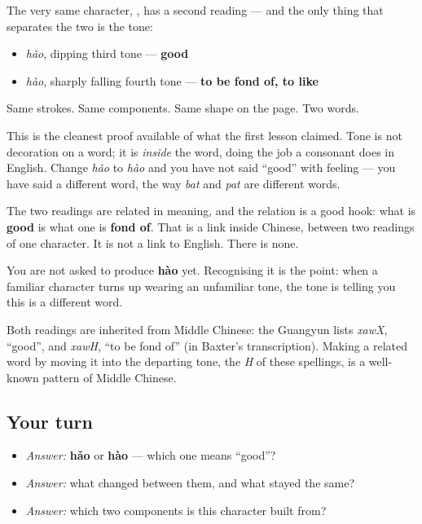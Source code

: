 \begin{cousinweb}
The very same character, \textbf{}, has a second reading — and the only thing that separates the two is the tone:

\begin{itemize}
\raggedright
  \item \textbf{} \emph{hǎo}, dipping third tone — \textbf{good}
  \item \textbf{} \emph{hào}, sharply falling fourth tone — \textbf{to be fond of, to like}
\end{itemize}

Same strokes. Same components. Same shape on the page. Two words.

This is the cleanest proof available of what the first lesson claimed. Tone is not decoration on a word; it is \emph{inside} the word, doing the job a consonant does in English. Change \emph{hǎo} to \emph{hào} and you have not said \textquotedblleft{}good\textquotedblright{} with feeling — you have said a different word, the way \emph{bat} and \emph{pat} are different words.

The two readings are related in meaning, and the relation is a good hook: what is \textbf{good} is what one is \textbf{fond of}. That is a link inside Chinese, between two readings of one character. It is not a link to English. There is none.

You are not asked to produce \textbf{hào} yet. Recognising it is the point: when a familiar character turns up wearing an unfamiliar tone, the tone is telling you this is a different word.

Both readings are inherited from Middle Chinese: the Guangyun lists \emph{xawX}, \textquotedblleft{}good\textquotedblright{}, and \emph{xawH}, \textquotedblleft{}to be fond of\textquotedblright{} (in Baxter's transcription). Making a related word by moving it into the departing tone, the \emph{H} of these spellings, is a well-known pattern of Middle Chinese.
\end{cousinweb}

\subsection*{Your turn}
\begin{itemize}
\raggedright
  \item \emph{Answer:} \textbf{hǎo} or \textbf{hào} — which one means \textquotedblleft{}good\textquotedblright{}?
  \item \emph{Answer:} what changed between them, and what stayed the same?
  \item \emph{Answer:} which two components is this character built from?
\end{itemize}

